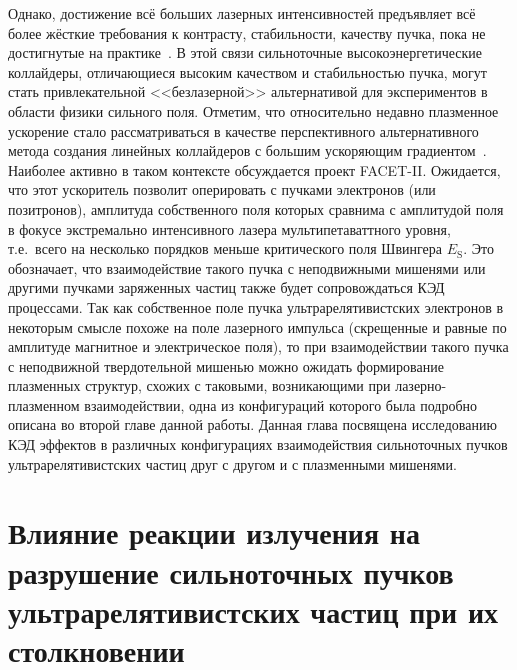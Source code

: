 Однако, достижение всё больших лазерных интенсивностей предъявляет всё более жёсткие требования к контрасту, стабильности, качеству пучка, пока не достигнутые на практике~\cite{danson2019petawatt}.
В этой связи сильноточные высокоэнергетические коллайдеры, отличающиеся высоким качеством и стабильностью пучка, могут стать привлекательной <<безлазерной>> альтернативой для экспериментов в области физики сильного поля.
Отметим, что относительно недавно плазменное ускорение стало рассматриваться в качестве перспективного альтернативного метода создания линейных коллайдеров с большим ускоряющим градиентом~\cite{schroeder2010physics}.
Наиболее активно в таком контексте обсуждается проект FACET-II\cite{FACET, yakimenko2019prospect, del2019bright}.
Ожидается, что этот ускоритель позволит оперировать с пучками электронов (или позитронов), амплитуда собственного поля которых сравнима с амплитудой поля в фокусе экстремально интенсивного лазера мультипетаваттного уровня, т.е.~всего на несколько порядков меньше критического поля Швингера $E_\mathrm{S}$.
Это обозначает, что взаимодействие такого пучка с неподвижными мишенями или другими пучками заряженных частиц также будет сопровождаться КЭД процессами.
Так как собственное поле пучка ультрарелятивистских электронов в некоторым смысле похоже на поле лазерного импульса (скрещенные и равные по амплитуде магнитное и электрическое поля), то при взаимодействии такого пучка с неподвижной твердотельной мишенью можно ожидать формирование плазменных структур, схожих с таковыми, возникающими при лазерно-плазменном взаимодействии, одна из конфигураций которого была подробно описана во второй главе данной работы.
Данная глава посвящена исследованию КЭД эффектов в различных конфигурациях взаимодействия сильноточных пучков ультрарелятивистских частиц друг с другом и с плазменными мишенями. 

\section{Влияние реакции излучения на разрушение сильноточных пучков ультрарелятивистских частиц при их столкновении}\label{sec:ch3/sec3}

